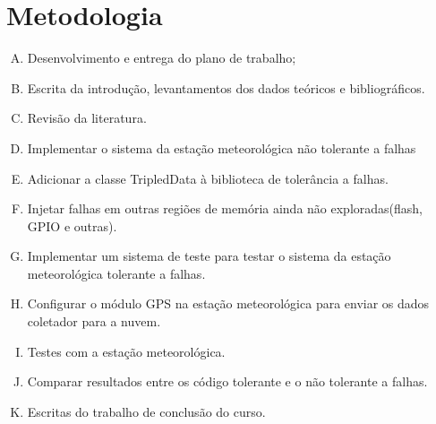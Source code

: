\documentclass[a4paper,12pt,brazil]{ufms-cpcx}
\begin{document}
\chapter{Metodologia} \label{cap: metodologia}

\begin{enumerate}[(A)]
	
\item Desenvolvimento e entrega do plano de trabalho;
\item Escrita da introdução, levantamentos dos dados teóricos e bibliográficos.
\item Revisão da literatura. 
\item Implementar o sistema da estação meteorológica não tolerante a falhas
\item Adicionar a classe TripledData à biblioteca de tolerância a falhas. 
\item Injetar falhas em outras regiões de memória ainda não exploradas(flash, GPIO e outras).
\item Implementar um sistema de teste para testar o sistema da estação meteorológica tolerante a falhas.
\item Configurar o módulo GPS na estação meteorológica para enviar os dados coletador para a nuvem. 
\item Testes com a estação meteorológica. 
\item Comparar resultados entre os código tolerante e o não tolerante a falhas.
\item Escritas do trabalho de conclusão do curso.		

	
\end{enumerate}
\end{document}
